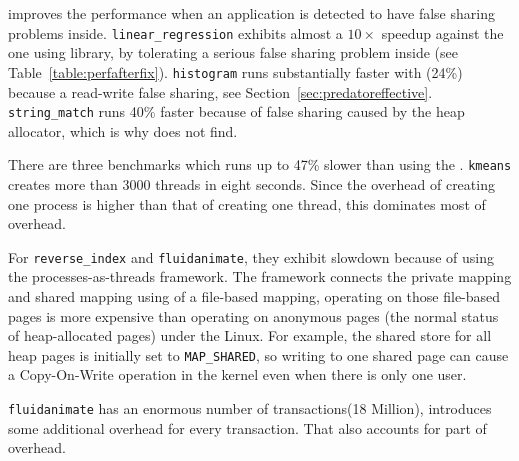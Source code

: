 \SheriffProtect{} improves the performance when an application is detected to have false sharing problems inside.  \texttt{linear\_regression} exhibits almost a $10\times$ speedup against the one using \pthreads{} library, by tolerating a serious false sharing problem inside (see Table~\ref{table:perfafterfix}). \texttt{histogram} runs substantially faster with \SheriffProtect{} (24\%) because a read-write false sharing, see Section~\ref{sec:predatoreffective}. \texttt{string\_match} runs 40\% faster because of false sharing caused by the \pthreads{} heap allocator, which is why \SheriffDetect{} does not find. 

There are three benchmarks which runs up to 47\% slower than using the \pthreads{}. 
\texttt{kmeans} creates more than 3000 threads in eight seconds. Since the overhead of creating one process is higher than that of creating one thread, this dominates most of overhead. 

For \texttt{reverse\_index} and \texttt{fluidanimate}, 
they exhibit slowdown because of using the processes-as-threads framework. The \Sheriff{} framework connects the private mapping and shared mapping using of a file-based mapping, operating on those file-based pages is more expensive than operating on anonymous pages (the normal status of heap-allocated pages) under the Linux. For example, the shared store for all heap pages is initially set to \texttt{MAP\_SHARED}, so writing to one shared page can cause a Copy-On-Write operation in the kernel even when there is only one user. 

\texttt{fluidanimate} has an enormous number of transactions(18 Million), \sheriffprotect{} 
introduces some additional overhead for every transaction. That also accounts for part of overhead.
